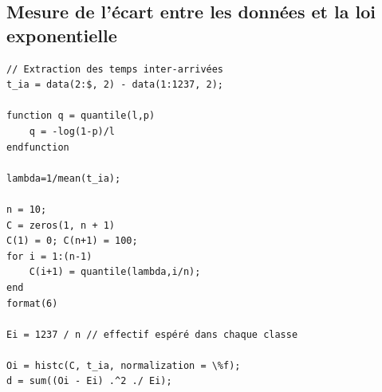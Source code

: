 \documentclass{article}
\begin{document}
\subsection{Mesure de l'écart entre les données et la loi exponentielle}
\begin{verbatim}
// Extraction des temps inter-arrivées
t_ia = data(2:$, 2) - data(1:1237, 2);

function q = quantile(l,p)
    q = -log(1-p)/l
endfunction

lambda=1/mean(t_ia);

n = 10;
C = zeros(1, n + 1)
C(1) = 0; C(n+1) = 100; 
for i = 1:(n-1)
    C(i+1) = quantile(lambda,i/n);
end
format(6)

Ei = 1237 / n // effectif espéré dans chaque classe

Oi = histc(C, t_ia, normalization = \%f);
d = sum((Oi - Ei) .^2 ./ Ei);
\end{verbatim}

\end{document}
